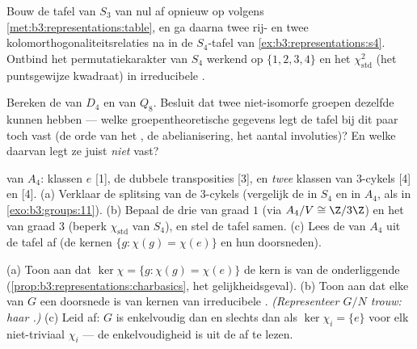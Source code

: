 \begin{exercise}[$\star$]\label{exo:b3:representations:3}
Bouw de tafel van $S_3$ van nul af opnieuw op volgens
\cref{met:b3:representations:table}, en ga daarna twee rij- en
twee kolomorthogonaliteitsrelaties na in de $S_4$-tafel van
\cref{ex:b3:representations:s4}. Ontbind het permutatiekarakter
van $S_4$ werkend op $\{1,2,3,4\}$ en het 
$\chi_{\mathrm{std}}^2$ (het puntsgewijze kwadraat) in
irreducibele .
\end{exercise}

\begin{exercise}[$\star\star$]\label{exo:b3:representations:4}
Bereken de  van $D_4$ en van $Q_8$. Besluit dat twee
niet-isomorfe groepen dezelfde  kunnen hebben ---
welke groepentheoretische gegevens legt de tafel bij dit paar toch
vast (de orde van het , de abelianisering, het aantal
involuties)? En welke daarvan legt ze juist \emph{niet} vast?
\end{exercise}

\begin{exercise}[$\star\star$]\label{exo:b3:representations:5}
 van $A_4$: klassen $e$ [1], de dubbele transposities
[3], en \emph{twee} klassen van $3$-cykels [4] en [4].
(a) Verklaar de splitsing van de $3$-cykels (vergelijk de
 in $S_4$ en in $A_4$, als in
\cref{exo:b3:groups:11}).
(b) Bepaal de drie  van graad $1$ (via $A_4/V \cong
\Z/3\Z$) en het  van graad $3$ (beperk
$\chi_{\mathrm{std}}$ van $S_4$), en stel de tafel samen.
(c) Lees de  van $A_4$ uit de tafel af (de kernen
$\{g : \chi(g) = \chi(e)\}$ en hun doorsneden).
\end{exercise}

\begin{exercise}[$\star\star$]\label{exo:b3:representations:6}
(a) Toon aan dat $\ker\chi = \{g : \chi(g) = \chi(e)\}$ de kern is
van de onderliggende 
(\cref{prop:b3:representations:charbasics}, het gelijkheidsgeval).
(b) Toon aan dat elke  van $G$ een doorsnede is van
kernen van irreducibele . \emph{(Representeer $G/N$
trouw: haar .)}
(c) Leid af: $G$ is enkelvoudig dan en slechts dan als $\ker\chi_i
= \{e\}$ voor elk niet-triviaal  $\chi_i$ --- de
enkelvoudigheid is uit de  af te lezen.
\end{exercise}

